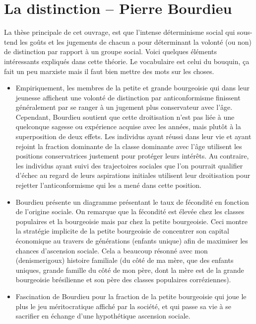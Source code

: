 \section{La distinction -- Pierre Bourdieu}

La thèse principale de cet ouvrage, est que l'intense déterminisme social qui sous-tend les goûts et les jugements de chacun a pour déterminant la volonté (ou non) de distinction par rapport à un groupe social.
Voici quelques éléments intéressants expliqués dans cette théorie.
Le vocabulaire est celui du bouquin, ça fait un peu marxiste mais il faut bien mettre des mots sur les choses.

\begin{itemize}
  \item Empiriquement, les membres de la petite et grande bourgeoisie qui dans leur jeunesse affichent une volonté de distinction par anticonformisme finissent généralement par se ranger à un jugement plus conservateur avec l'âge.
  Cependant, Bourdieu soutient que cette droitisation n'est pas liée à une quelconque sagesse ou expérience acquise avec les années, mais plutôt à la superposition de deux effets.
  Les individus ayant réussi dans leur vie et ayant rejoint la fraction dominante de la classe dominante avec l'âge utilisent les positions conservatrices justement pour protéger leurs intérêts.
  Au contraire, les individus ayant suivi des trajectoires sociales que l'on pourrait qualifier d'échec au regard de leurs aspirations initiales utilisent leur droitisation pour rejetter l'anticonformisme qui les a mené dans cette position.
  \item Bourdieu présente un diagramme présentant le taux de fécondité en fonction de l'origine sociale.
  On remarque que la fécondité est élevée chez les classes populaires et la bourgeoisie mais par chez la petite bourgeoisie.
  Ceci montre la stratégie implicite de la petite bourgeoisie de concentrer son capital économique au travers de générations (enfants unique) afin de maximiser les chances d'ascension sociale.
  Cela a beaucoup résonné avec mon (denismerigoux) histoire familiale (du côté de ma mère, que des enfants uniques, grande famille du côté de mon père, dont la mère est de la grande bourgeoisie brésilienne et son père des classes populaires corréziennes).
  \item Fascination de Bourdieu pour la fraction de la petite bourgeoisie qui joue le plus le jeu méritocratique affiché par la société, et qui passe sa vie à se sacrifier en échange d'une hypothétique ascension sociale.

\end{itemize}
